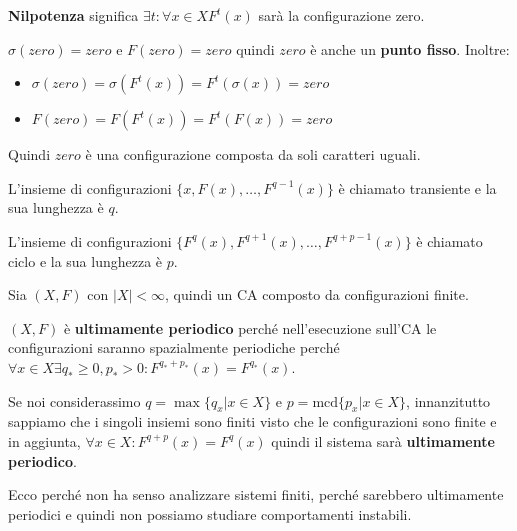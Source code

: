 \begin{definizione} 
    \textbf{Nilpotenza} significa $\exists t:\forall x\in X$$F^t(x)$ sarà la configurazione
    zero.
\end{definizione}

\begin{nota}
    $\sigma(zero) = zero$ e $F(zero) = zero$ quindi $zero$ è anche un \textbf{punto fisso}.
    Inoltre:
    \begin{itemize}
        \item $\sigma(zero) = \sigma(F^t(x)) = F^t(\sigma(x)) = zero$
        \item $F(zero) = F(F^t(x)) = F^t(F(x)) = zero$
    \end{itemize}
    Quindi $zero$ è una configurazione composta da soli caratteri uguali.
\end{nota}

L'insieme di configurazioni $\{x,F(x), \dots, F^{q-1}(x)\}$ è chiamato transiente
e la sua lunghezza è $q$.

L'insieme di configurazioni $\{F^q(x), F^{q+1}(x), \dots, F^{q+p-1}(x)\}$ è chiamato ciclo
e la sua lunghezza è $p$.

\begin{nota}
    Sia $(X,F)$ con $|X|<\infty$, quindi un CA composto da configurazioni finite.

    $(X,F)$ è \textbf{ultimamente periodico} perché nell'esecuzione sull'CA le
    configurazioni saranno spazialmente periodiche perché
    $\forall x\in X\exists q_\ast \ge 0, p_\ast >0: F^{q_\ast +p_\ast}(x)=F^{q_\ast}(x)$.

    Se noi considerassimo $q=\max\{q_x|x\in X\}$ e $p=\text{mcd}\{p_x|x\in X\}$,
    innanzitutto sappiamo che i singoli insiemi sono finiti visto che le configurazioni
    sono finite e in aggiunta, $\forall x\in X:F^{q+p}(x)=F^{q}(x)$
    quindi il sistema sarà \textbf{ultimamente periodico}.
\end{nota}

Ecco perché non ha senso analizzare sistemi finiti, perché sarebbero ultimamente
periodici e quindi non possiamo studiare comportamenti instabili.

